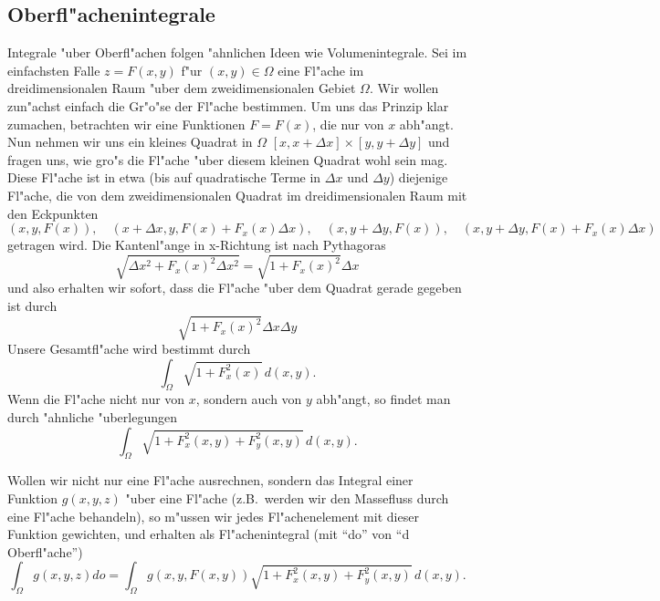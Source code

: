 \begin{auf}\cha\label{block8A3}

\end{auf}
\subsection{Oberfl"achenintegrale}\label{oberlaecheIntegral}
Integrale "uber Oberfl"achen folgen "ahnlichen Ideen wie Volumenintegrale. Sei im 
einfachsten Falle $z=F(x,y)$ f"ur $(x,y)\in \Omega$ eine Fl"ache
im dreidimensionalen Raum "uber dem zweidimensionalen Gebiet $\Omega$. Wir wollen 
zun"achst einfach die Gr"o"se der Fl"ache bestimmen. Um uns das Prinzip klar zumachen, 
betrachten wir eine Funktionen $F=F(x)$, die nur von $x$ abh"angt. Nun nehmen wir uns 
ein kleines Quadrat in $\Omega$ $[x,x+\Delta x]\times [y, y+\Delta y]$ und fragen uns,
wie gro"s die Fl"ache "uber diesem kleinen Quadrat wohl sein mag. Diese Fl"ache ist in etwa (bis auf quadratische Terme in $\Delta x$ und
$\Delta y$) diejenige Fl"ache, die von dem zweidimensionalen Quadrat im dreidimensionalen Raum mit den Eckpunkten
$$ (x,y,F(x)),\quad (x+\Delta x, y, F(x)+F_x(x)\Delta x), \quad(x, y+\Delta y, F(x)), \quad
(x, y+\Delta y, F(x)+F_x(x)\Delta x  )
$$
getragen wird. Die Kantenl"ange in x-Richtung ist nach Pythagoras
$$ \sqrt{\Delta x ^2 + F_x(x)^2 \Delta x ^2} = \sqrt{1 + F_x(x)^2 } \Delta x
$$
und also erhalten wir sofort, dass die Fl"ache "uber dem Quadrat gerade gegeben ist durch
$$ \sqrt{1 + F_x(x)^2 } \Delta x\Delta y$$
Unsere Gesamtfl"ache wird bestimmt durch
$$ \int_\Omega \sqrt{1+F_x^2(x)}\, d(x,y).$$
Wenn die Fl"ache nicht nur von $x$, sondern auch von $y$ abh"angt, 
so findet man durch "ahnliche "uberlegungen
$$ \int_\Omega \sqrt{1+F_x^2(x,y)+F_y^2(x,y)}\, d(x,y).$$

Wollen wir nicht nur eine Fl"ache ausrechnen, sondern das Integral einer Funktion 
$g(x,y,z)$ "uber eine Fl"ache (z.B.\ werden wir den Massefluss durch eine 
Fl"ache 
behandeln), so m"ussen wir jedes Fl"achenelement mit dieser Funktion gewichten, 
und erhalten als Fl"achenintegral (mit ``do'' von ``d Oberfl"ache'')
$$ \int_\Omega g(x,y,z)do = \int_\Omega g(x,y,F(x,y))  \sqrt{1+F_x^2(x,y)+F_y^2(x,y)}\, d(x,y).$$

